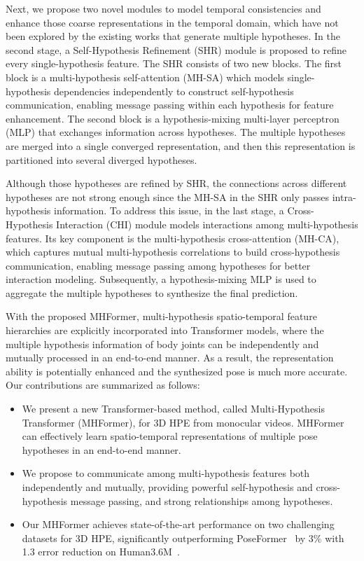 \documentclass[10pt,twocolumn,letterpaper]{article}
\begin{document}
Next, we propose two novel modules to model temporal consistencies and enhance those coarse representations in the temporal domain, which have not been explored by the existing works that generate multiple hypotheses.
In the second stage, a Self-Hypothesis Refinement (SHR) module is proposed to refine every single-hypothesis feature. 
The SHR consists of two new blocks.
The first block is a multi-hypothesis self-attention (MH-SA) which models single-hypothesis dependencies independently to construct self-hypothesis communication, enabling message passing within each hypothesis for feature enhancement. 
The second block is a hypothesis-mixing multi-layer perceptron (MLP) that exchanges information across hypotheses. 
The multiple hypotheses are merged into a single converged representation, and then this representation is partitioned into several diverged hypotheses. 

Although those hypotheses are refined by SHR, the connections across different hypotheses are not strong enough since the MH-SA in the SHR only passes intra-hypothesis information. 
To address this issue, in the last stage, a Cross-Hypothesis Interaction (CHI) module models interactions among multi-hypothesis features. 
Its key component is the multi-hypothesis cross-attention (MH-CA), which captures mutual multi-hypothesis correlations to build cross-hypothesis communication, enabling message passing among hypotheses for better interaction modeling. 
Subsequently, a hypothesis-mixing MLP is used to aggregate the multiple hypotheses to synthesize the final prediction. 

With the proposed MHFormer, multi-hypothesis spatio-temporal feature hierarchies are explicitly incorporated into Transformer models, where the multiple hypothesis information of body joints can be independently and mutually processed in an end-to-end manner. 
As a result, the representation ability is potentially enhanced and the synthesized pose is much more accurate. 
Our contributions are summarized as follows:
\begin{itemize}
  \item We present a new Transformer-based method, called Multi-Hypothesis Transformer (MHFormer), for 3D HPE from monocular videos. 
  MHFormer can effectively learn spatio-temporal representations of multiple pose hypotheses in an end-to-end manner. 
  \item We propose to communicate among multi-hypothesis features both independently and mutually, providing powerful self-hypothesis and cross-hypothesis message passing, and strong relationships among hypotheses. 
  \item Our MHFormer achieves state-of-the-art performance on two challenging datasets for 3D HPE, significantly outperforming PoseFormer~\cite{poseformer} by 3\% with 1.3  error reduction on Human3.6M~\cite{ionescu2013human3}. 
\end{itemize}
\end{document}
